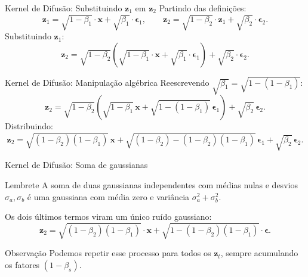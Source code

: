 \documentclass[aspectratio=169,xcolor=dvipsnames]{beamer}
\begin{document}
  \begin{frame}{Kernel de Difusão: Substituindo $\mathbf{z}_1$ em $\mathbf{z}_2$}
    Partindo das definições:
    \vspace{0.2em}
    \[
      \mathbf{z}_1 = \sqrt{1 - \beta_1}\cdot \mathbf{x} + \sqrt{\beta_1}\cdot \boldsymbol{\epsilon}_1,
      \qquad
      \mathbf{z}_2 = \sqrt{1 - \beta_2}\cdot \mathbf{z}_1 + \sqrt{\beta_2}\cdot \boldsymbol{\epsilon}_2.
    \]
    \vspace{0.2em}
    Substituindo $\mathbf{z}_1$:
    \[
      \mathbf{z}_2 = \sqrt{1 - \beta_2}\!\left(\sqrt{1 - \beta_1}\cdot \mathbf{x} + \sqrt{\beta_1}\cdot \boldsymbol{\epsilon}_1\right) + \sqrt{\beta_2}\cdot \boldsymbol{\epsilon}_2.
    \]
  \end{frame}

  \begin{frame}{Kernel de Difusão: Manipulação algébrica}
    Reescrevendo $\sqrt{\beta_1} = \sqrt{1 - (1 - \beta_1)}$:
    \vspace{0.2em}
    \[
      \mathbf{z}_2 = \sqrt{1-\beta_2}\!\left(\sqrt{1-\beta_1}\,\mathbf{x} + \sqrt{1-(1-\beta_1)}\,\boldsymbol{\epsilon}_1\right) + \sqrt{\beta_2}\,\boldsymbol{\epsilon}_2.
    \]
    \vspace{0.2em}
    Distribuindo:
    \[
      \mathbf{z}_2 = \sqrt{(1-\beta_2)(1-\beta_1)}\,\mathbf{x}
      + \sqrt{(1-\beta_2) - (1-\beta_2)(1-\beta_1)}\,\boldsymbol{\epsilon}_1
      + \sqrt{\beta_2}\,\boldsymbol{\epsilon}_2.
    \]
  \end{frame}

  \begin{frame}{Kernel de Difusão: Soma de gaussianas}
    \begin{alertblock}{Lembrete}
      A soma de duas gaussianas independentes com médias nulas e
      desvios $\sigma_a, \sigma_b$ é uma gaussiana com média zero e
      variância $\sigma_a^2 + \sigma_b^2$.
    \end{alertblock}
    \vspace{0.3em}
    Os dois últimos termos viram um único ruído gaussiano:
    \[
      \mathbf{z}_2 = \sqrt{(1-\beta_2)(1-\beta_1)}\cdot \mathbf{x}
      + \sqrt{1 - (1-\beta_2)(1-\beta_1)}\cdot \boldsymbol{\epsilon}.
    \]
    \begin{block}{Observação}
      Podemos repetir esse processo para todos os $\mathbf{z}_t$, sempre
      acumulando os fatores $(1 - \beta_s)$.
    \end{block}
  \end{frame}
\end{document}

